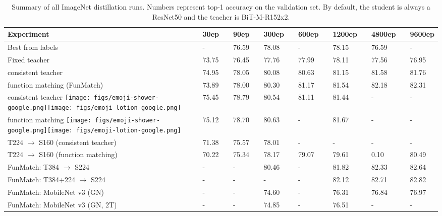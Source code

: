 \documentclass[10pt,twocolumn,letterpaper]{article}
\def \shampoo {\texttt{[image: figs/emoji-shower-google.png]}\texttt{[image: figs/emoji-lotion-google.png]}\xspace}
\begin{document}
\begin{table*}[t]
  \setlength{\tabcolsep}{0pt}
  \setlength{\extrarowheight}{5pt}
  \renewcommand{\arraystretch}{0.75}
  \centering
  \vspace{-2em}
  \caption{Summary of all ImageNet distillation runs. Numbers represent top-1 accuracy on the validation set. By default, the student is always a ResNet50 and the teacher is BiT-M-R152x2.}\label{tbl:models}
\begin{tabularx}{\linewidth}{p{5.4cm}p{0.1cm}Cp{0.01cm}Cp{0.01cm}Cp{0.01cm}Cp{0.01cm}Cp{0.01cm}Cp{0.01cm}C}
    \toprule[1pt]
    \bf{Experiment} && \bf{30ep} && \bf{90ep} && \bf{300ep} && \bf{600ep} && \bf{1200ep} && \bf{4800ep} && \bf{9600ep} \\
    \midrule
Best from labels     &&   -   && 76.59 && 78.08 &&   -   && 78.15 && 76.59 &&   -   \\
Fixed teacher        && 73.75 && 76.45 && 77.76 && 77.99 && 78.11 && 77.56 && 76.95 \\
consistent teacher   && 74.95 && 78.05 && 80.08 && 80.63 && 81.15 && 81.58 && 81.76 \\
function matching (FunMatch) && 73.89 && 78.00 && 80.30 && 81.17 && 81.54 && 82.18 && 82.31 \\
    \midrule
consistent teacher \shampoo     && 75.45 && 78.79 && 80.54 && 81.11 && 81.44 &&   -   &&   -   \\
function matching \shampoo       && 75.12 && 78.70 && 80.63 &&   -   && 81.67 &&   -   &&   -   \\
    \midrule
T224 $\rightarrow$ S160 (consistent teacher)  && 71.38 && 75.57 && 78.01 &&   -   &&   -   &&   -   &&   -   \\
T224 $\rightarrow$ S160 (function matching)   && 70.22 && 75.34 && 78.17 && 79.07 && 79.61 &&  0.10 && 80.49 \\
    \midrule[0.25pt]
FunMatch: T384 $\rightarrow$ S224          &&   -   &&   -   && 80.46 &&   -   && 81.82 && 82.33 && 82.64 \\
    \midrule[0.25pt]
FunMatch: T384+224 $\rightarrow$ S224      &&   -   &&   -   &&   -   &&   -   && 82.12 && 82.71 && 82.82 \\
\midrule
FunMatch: MobileNet v3 (GN)    &&   -   &&   -   && 74.60 &&   -   && 76.31 && 76.84 && 76.97 \\
FunMatch: MobileNet v3 (GN, 2T) &&   -   &&   -   && 74.85 &&   -   && 76.51 &&   -   &&   -   \\

\end{tabularx}
\end{table*}
\end{document}
